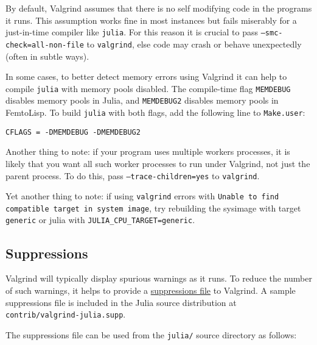 By default, Valgrind assumes that there is no self modifying code in the programs it runs.  This assumption works fine in most instances but fails miserably for a just-in-time compiler like \texttt{julia}.  For this reason it is crucial to pass \texttt{--smc-check=all-non-file} to \texttt{valgrind}, else code may crash or behave unexpectedly (often in subtle ways).



In some cases, to better detect memory errors using Valgrind it can help to compile \texttt{julia} with memory pools disabled.  The compile-time flag \texttt{MEMDEBUG} disables memory pools in Julia, and \texttt{MEMDEBUG2} disables memory pools in FemtoLisp.  To build \texttt{julia} with both flags, add the following line to \texttt{Make.user}:




\begin{verbatim}
CFLAGS = -DMEMDEBUG -DMEMDEBUG2
\end{verbatim}



Another thing to note: if your program uses multiple workers processes, it is likely that you want all such worker processes to run under Valgrind, not just the parent process.  To do this, pass \texttt{--trace-children=yes} to \texttt{valgrind}.



Yet another thing to note: if using \texttt{valgrind} errors with \texttt{Unable to find compatible target in system image}, try rebuilding the sysimage with target \texttt{generic} or julia with \texttt{JULIA\_CPU\_TARGET=generic}.



\hypertarget{9183907630008953484}{}


\subsection{Suppressions}



Valgrind will typically display spurious warnings as it runs.  To reduce the number of such warnings, it helps to provide a \href{https://valgrind.org/docs/manual/manual-core.html\#manual-core.suppress}{suppressions file} to Valgrind.  A sample suppressions file is included in the Julia source distribution at \texttt{contrib/valgrind-julia.supp}.



The suppressions file can be used from the \texttt{julia/} source directory as follows:




